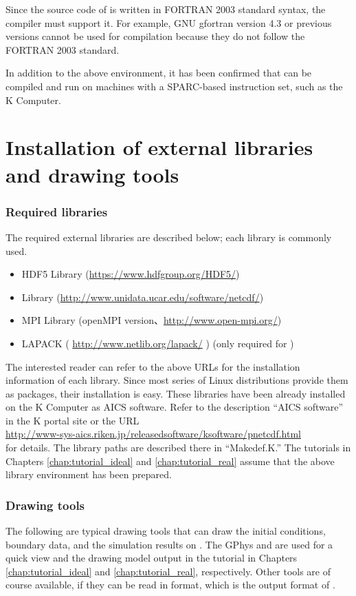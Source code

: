 Since the source code of \scalelib is  written in FORTRAN 2003 standard syntax, the compiler must support it. For example, GNU gfortran version 4.3 or previous versions cannot be used for \scalelib compilation because they do not follow the FORTRAN 2003 standard.

In addition to the above environment, it has been confirmed that \scalelib can be compiled and run on  machines with a SPARC-based instruction set, such as the K Computer.


\section{Installation of external libraries and drawing tools} \label{sec:inst_env}
\subsubsection{Required libraries}
The required external libraries are described below; each library is commonly used.
\begin{itemize}
\item HDF5 Library (\url{https://www.hdfgroup.org/HDF5/})
\item {\netcdf} Library (\url{http://www.unidata.ucar.edu/software/netcdf/})
\item MPI Library (openMPI version、\url{http://www.open-mpi.org/})
\item LAPACK ( \url{http://www.netlib.org/lapack/} ) (only required for \scalegm)
\end{itemize}
The interested reader can refer to the above URLs for the installation information of each library.  Since most series of Linux distributions provide them as packages, their installation is easy. These libraries have been already installed on the K Computer as AICS software. Refer to the description ``AICS software'' in the K portal site or the URL\\ \url{http://www-sys-aics.riken.jp/releasedsoftware/ksoftware/pnetcdf.html}\\ for details. The library paths are described there in ``Makedef.K.'' The tutorials in Chapters \ref{chap:tutorial_ideal} and \ref{chap:tutorial_real} assume that the above library environment has been prepared.


\subsubsection{Drawing tools}
The following are typical drawing tools that can draw
the initial conditions, boundary data, and the simulation results on \scalelib.
The GPhys and \grads are used for a quick view
and the drawing model output in the tutorial in Chapters \ref{chap:tutorial_ideal} and \ref{chap:tutorial_real}, respectively.
Other tools are of course available,
if they can be read in \netcdf format, which is the output format of \scalelib.

